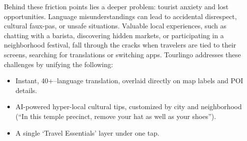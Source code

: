 \begin{sloppypar}
Behind these friction points lies a deeper problem: tourist anxiety and lost opportunities. Language misunderstandings can lead to accidental disrespect, cultural faux-pas, or unsafe situations. Valuable local experiences, such as chatting with a barista, discovering hidden markets, or participating in a neighborhood festival, fall through the cracks when travelers are tied to their screens, searching for translations or switching apps. Tourlingo addresses these challenges by unifying the following:
\pagebreak 
\begin{itemize}
\item Instant, 40+–language translation, overlaid directly on map labels and POI details.
\item AI-powered hyper-local cultural tips, customized by city and neighborhood (``In this temple precinct, remove your hat as well as your shoes'').
\item A single ‘Travel Essentials’ layer under one tap.
\end{itemize}


\end{sloppypar}
